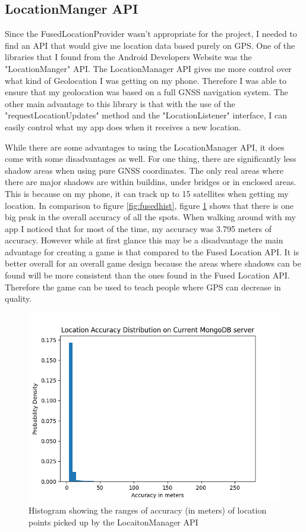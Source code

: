 \documentclass{l4proj}
\begin{document}
\subsection{LocationManger API}
Since the FusedLocationProvider wasn't appropriate for the project, I needed to find an API that would give me location data based purely on GPS. One of the libraries that I found
from the Android Developers Website was the "LocationManger" API. The LocationManager API gives me more control over what kind of Geolocation I was getting on my phone. Therefore
I was able to ensure that my geolocation was based on a full GNSS navigation system. \citep{locationManager} The other main advantage to this library is that with the use of the "requestLocationUpdates" method and
the "LocationListener" interface, I can easily control what my app does when it receives a new location.

While there are some advantages to using the LocationManager API, it does come with some disadvantages as well. For one thing, there are significantly less shadow areas when using
pure GNSS coordinates. The only real areas where there are major shadows are within buildins, under bridges or in enclosed areas. This is because on my phone, it can track up to 
15 satellites when getting my location. In comparison to figure \ref{fig:fusedhist}, figure \ref{fig:mongohist} shows that there is one big peak in the overall accuracy of all the spots.
When walking around with my app I noticed that for most of the time, my accuracy was 3.795 meters of accuracy. However while at first glance this may be a disadvantage the main advantage for creating a
game is that compared to the Fused Location API. It is better overall for an overall game design because the areas where shadows can be found will be more consistent than the ones
found in the Fused Location API. Therefore the game can be used to teach people where GPS can decrease in quality.

\begin{figure}
    \centering
    \includegraphics[width=0.6\linewidth]{images/mongo_db_histogram.png}

    \caption{Histogram showing the ranges of accuracy (in meters) of location points picked up by the LocaitonManager API}

    \label{fig:mongohist}
\end{figure}
\end{document}
